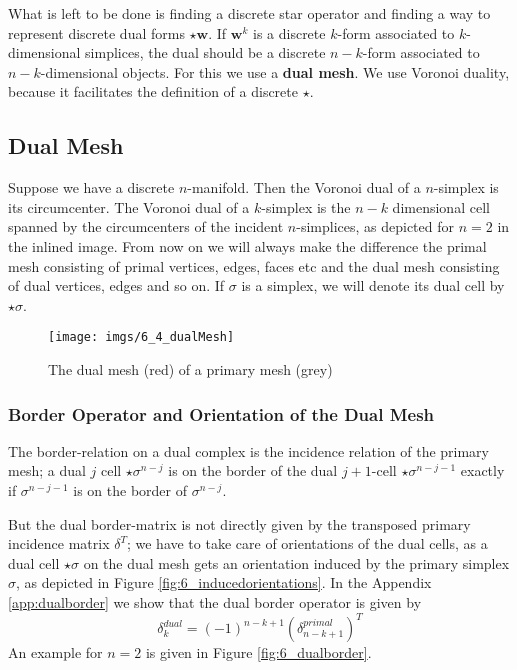 What is left to be done is finding a discrete star operator and finding a way to represent discrete dual forms $\star \textbf{w}$. If $\textbf{w}^k$ is a discrete $k$-form associated to $k$-dimensional simplices, the dual should be a discrete $n-k$-form associated to $n-k$-dimensional objects. For this we use a \textbf{dual mesh}. We use Voronoi duality, because it facilitates the definition of a discrete $\star$.

\subsection{Dual Mesh}
Suppose we have a discrete $n$-manifold. Then the Voronoi dual of a $n$-simplex is its circumcenter. The Voronoi dual of a $k$-simplex is the $n-k$ dimensional cell spanned by the circumcenters of the incident $n$-simplices, as depicted for $n=2$ in the inlined image. From now on we will always make the difference the primal mesh consisting of primal vertices, edges, faces etc and the dual mesh consisting of dual vertices, edges and so on. If $\sigma$ is a simplex, we will denote its dual cell by $\star \sigma$.

\begin{figure}%
\begin{center}
\texttt{[image: imgs/6\_4\_dualMesh]}
\end{center}
\caption{The dual mesh (red) of a primary mesh (grey)}%
\label{fig:6_dualmesh}%
\end{figure}

\subsubsection{Border Operator and Orientation of the Dual Mesh}

The border-relation on a dual complex is the incidence relation of the primary mesh; a dual $j$ cell $\star \sigma^{n-j}$ is on the border of the dual $j+1$-cell $\star \sigma^{n-j-1}$ exactly if $\sigma^{n-j-1}$ is on the border of $\sigma^{n-j}$.

But the dual border-matrix is not directly given by the transposed primary incidence matrix $\delta^T$; we have to take care of orientations of the dual cells, as a dual cell $\star \sigma$ on the dual mesh gets an orientation induced by the primary simplex $\sigma$, as depicted in Figure \ref{fig:6_inducedorientations}.
In the Appendix \ref{app:dualborder} we show that the dual border operator is given by
\begin{equation}\delta_{k}^{dual} = (-1)^{n-k+1} (\delta_{n-k+1}^{primal})^T\label{eq:dualBorderOp}\end{equation}
An example for $n=2$ is given in Figure \ref{fig:6_dualborder}.

